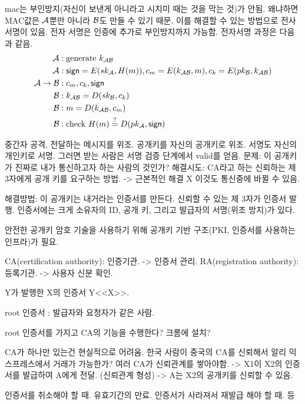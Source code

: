 mac는 부인방지(자신이 보낸게 아니라고 시치미 때는 것을 막는 것)가 안됨. 왜냐하면
MAC값은 $\mathcal{A}$뿐만 아니라 $\mathcal{B}$도 만들 수 있기 때문. 이를 해결할 수 있는
방법으로 전사서명이 있음. 전자 서명은 인증에 추가로 부인방지까지 가능함.
전자서명 과정은 다음과 같음.
\begin{equation}
  \begin{split}
    \mathcal{A} &: \text{generate } k_{\mathcal{A} \mathcal{B}} \\
    \mathcal{A} &: \textsf{sign} = E(sk_{\mathcal{A}}, H(m)), c_{m} = E(k_{\mathcal{A} \mathcal{B}}, m),
    c_{k} = E(pk_{\mathcal{B}}, k_{\mathcal{A} \mathcal{B}}) \\
    \mathcal{A} \to \mathcal{B} &: c_{m}, c_{k}, \textsf{sign} \\
    \mathcal{B} &: k_{\mathcal{A} \mathcal{B}} = D(sk_{\mathcal{B}}, c_{k}) \\
    \mathcal{B} &: m = D(k_{\mathcal{A} \mathcal{B}}, c_{m}) \\
    \mathcal{B} &: \text{check } H(m) \overset{?}{=} D(pk_{\mathcal{A}}, \textsf{sign})
  \end{split}
\end{equation}

중간자 공격, 전달하는 메시지를 위조. 공개키를 자신의 공개키로 위조. 서명도
자신의 개인키로 서명. 그러면 받는 사람은 서명 검증 단계에서 valid를 얻음. 문제:
이 공개키가 진짜로 내가 통신하고자 하는 사람의 것인가? 해결시도: CA라고 하는
신뢰하는 제 3자에게 공개 키를 요구하는 방법. -> 근본적인 해결 X 이것도 통신중에
바뀔 수 있음.

해결방법: 이 공개키는 내거라는 인증서를 만든다. 신뢰할 수 있는 제 3자가 인증서
발행. 인증서에는 크게 소유자의 ID, 공개 키, 그리고 발급자의 서명(위조 방지)가
있다.

안전한 공개키 암호 기술을 사용하기 위해 공개키 기반 구조(PKI, 인증서를 사용하는
인프라)가 필요.

CA(certification authority): 인증기관. -> 인증서 관리.
RA(registration authority): 등록기관. -> 사용자 신분 확인.

Y가 발행한 X의 인증서 Y<<X>>.

root 인증서 : 발급자와 요청자가 같은 사람.

root 인증서를 가지고 CA의 기능을 수행한다?
크롬에 설치?

CA가 하나만 있는건 현실적으로 어려움.
한국 사람이 중국의 CA를 신뢰해서 알리 익스프레스에서 거래가 가능한가? 여러 CA가 신뢰관계를 쌓아야함.
-> X1이 X2의 인증서를 발급하여 A에게 전달. (신뢰관계 형성)
-> A는 X2의 공개키를 신뢰할 수 있음.

인증서를 취소해야 할 때. 유효기간의 만료. 인증서가 사라져서 재발급 해야 할 때. 등

